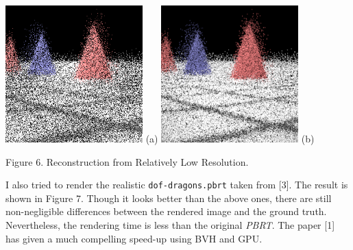 \documentclass{article}
\begin{document}
\begin{center}
  \includegraphics[width=150pt,height=150pt]{./MLD-7-07-4.png} (a)
  \includegraphics[width=150pt,height=150pt]{./MLD-7-07-4-256-10-1-0.png} (b) \;\;\;\;

  \small{Figure 6. Reconstruction from Relatively Low Resolution.}
\end{center}

I also tried to render the realistic \texttt{dof-dragons.pbrt} taken from [3]. The result is shown in Figure 7. Though it looks better than the above ones, there are still non-negligible differences between the rendered image and the ground truth. Nevertheless, the rendering time is less than the original \textit{PBRT}. The paper [1] has given a much compelling speed-up using BVH and GPU.

\clearpage
\end{document}
